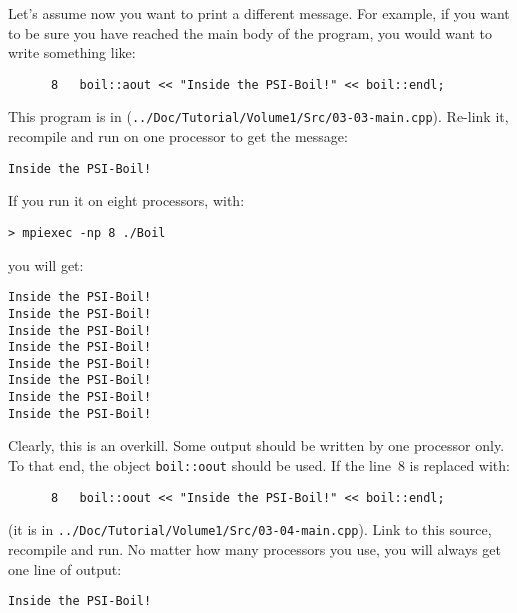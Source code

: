 Let's assume now you want to print a different message. For example, if you
want to be sure you have reached the main body of the program, you would
want to write something like:
%
{\small \begin{verbatim}
      8   boil::aout << "Inside the PSI-Boil!" << boil::endl;
\end{verbatim}}
%
This program is in ({\tt ../Doc/Tutorial/Volume1/Src/03-03-main.cpp}). Re-link
it, recompile and run on one processor to get the message:
%
{\small \begin{verbatim}
Inside the PSI-Boil!
\end{verbatim}}
%
If you run it on eight processors, with:
%
\begin{verbatim}
> mpiexec -np 8 ./Boil
\end{verbatim}
%
you will get:
%
{\small \begin{verbatim}
Inside the PSI-Boil!
Inside the PSI-Boil!
Inside the PSI-Boil!
Inside the PSI-Boil!
Inside the PSI-Boil!
Inside the PSI-Boil!
Inside the PSI-Boil!
Inside the PSI-Boil!
\end{verbatim}}
%
Clearly, this is an overkill. Some output should be written by one processor
only. To that end, the object {\tt boil::oout} should be used. If the line~8
is replaced with:
%
{\small \begin{verbatim}
      8   boil::oout << "Inside the PSI-Boil!" << boil::endl;
\end{verbatim}}
%
(it is in {\tt ../Doc/Tutorial/Volume1/Src/03-04-main.cpp}). Link to this
source, recompile and run. No matter how many processors you use, you will
always get one line of output:
%
{\small \begin{verbatim}
Inside the PSI-Boil!
\end{verbatim}}
%

\vspace*{5mm}  %

